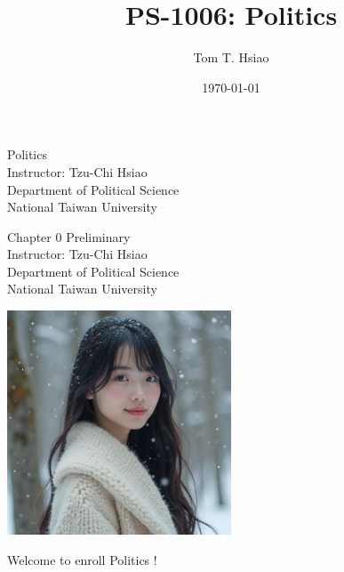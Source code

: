 \documentclass{beamer}
\title{PS-1006: Politics}
\author{Tom T. Hsiao}
\date{\today}
\begin{document}
\begin{frame}
\begin{center}
\Large{Politics} \\
\vspace{3em}
\normalsize{Instructor: Tzu-Chi Hsiao} \\
\vspace{3em}
\small{Department of Political Science} \\
\vspace{1em}
\small{National Taiwan University}
\end{center}
\end{frame}
\begin{frame}
\begin{center}
\Large{Chapter 0 Preliminary} \\
\vspace{3em}
\normalsize{Instructor: Tzu-Chi Hsiao} \\
\vspace{3em}
\small{Department of Political Science} \\
\vspace{1em}
\small{National Taiwan University} \\
\end{center}
\end{frame}
\begin{frame}{}
\begin{center}
\includegraphics[width=0.5\textwidth]{instructor.png}
\end{center}
\vspace{1em}
\begin{center}
\Large{Welcome to enroll Politics !} \\
\end{center}
\end{frame}
\end{document}
